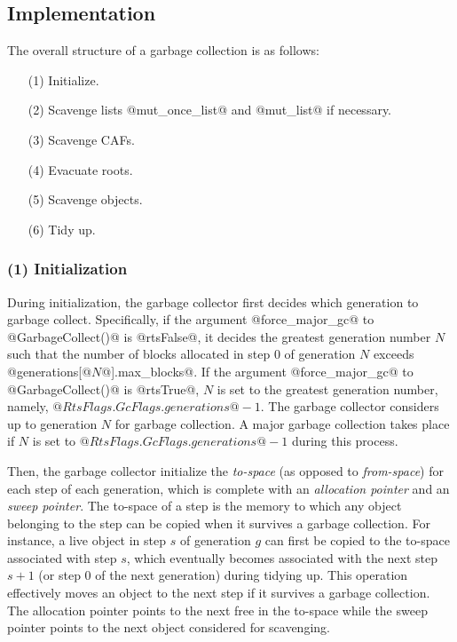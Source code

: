 \documentclass{article}
\begin{document}
\subsection{Implementation}

The overall structure of a garbage collection is as follows:

\begin{enumerate}
\item[(1)] Initialize.
\item[(2)] Scavenge lists @mut_once_list@ and @mut_list@ if necessary.
\item[(3)] Scavenge CAFs.
\item[(4)] Evacuate roots.
\item[(5)] Scavenge objects.
\item[(6)] Tidy up.
\end{enumerate}

\subsubsection{(1) Initialization}

During initialization, the garbage collector first decides which generation
to garbage collect.
Specifically, 
if the argument @force_major_gc@ to @GarbageCollect()@ is @rtsFalse@,
it decides the greatest generation number $N$ such
that the number of blocks allocated in step $0$ of generation $N$ exceeds
@generations[@$N$@].max_blocks@. 
If the argument @force_major_gc@ to @GarbageCollect()@ is @rtsTrue@,
$N$ is set to the greatest generation number, namely, 
$@RtsFlags.GcFlags.generations@ - 1$.
The garbage collector considers up to generation $N$ for garbage collection.
A major garbage collection takes place if $N$ is set to 
$@RtsFlags.GcFlags.generations@ - 1$ during this process.

Then, the garbage collector initialize the \emph{to-space} (as opposed to
\emph{from-space}) for each step of 
each generation, which is complete with an \emph{allocation pointer} and
an \emph{sweep pointer}.
The to-space of a step is the memory to which any object belonging to the
step can be copied when it survives a garbage collection.
For instance, a live object in step $s$ of generation $g$ can first be copied
to the to-space associated with step $s$, which eventually becomes 
associated with the next step $s + 1$ (or step $0$ of the next generation)
during tidying up.
This operation effectively moves an object to the next step if it survives
a garbage collection. 
The allocation pointer points to the next free in the to-space while 
the sweep pointer points to the next object considered for scavenging.
\end{document}
